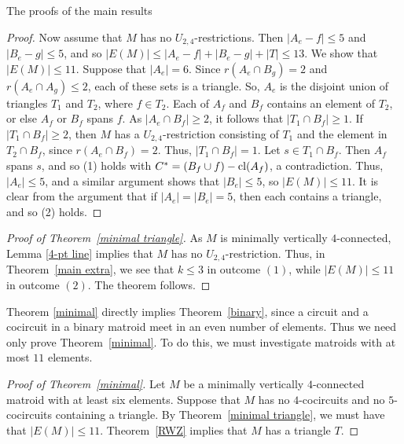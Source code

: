 \documentclass[12pt]{amsart}
\begin{document}
\begin{section}{The proofs of the main results}
\begin{proof}
Now assume that $M$ has no $U_{2,4}$-restrictions.
Then $|A_e - f| \le 5$ and $|B_e - g| \le 5$, and so $|E(M)| \le |A_e - f| + |B_e - g| + |T| \le 13$.
We show that $|E(M)| \le 11$.
Suppose that $|A_e| = 6$.
Since $r(A_e \cap B_g) = 2$ and $r(A_e \cap A_g) \le 2$, each of these sets is a triangle.
So, $A_e$ is the disjoint union of triangles $T_1$ and $T_2$, where $f \in T_2$.
Each of $A_f$ and $B_f$ contains an element of $T_2$, or else $A_f$ or $B_f$ spans $f$.
As $|A_e \cap B_f| \ge 2$, it follows that $|T_1 \cap B_f| \ge 1$.
If $|T_1 \cap B_f| \ge 2$, then $M$ has a $U_{2,4}$-restriction consisting of $T_1$ and the element in $T_2 \cap B_f$, since $r(A_e \cap B_f) = 2$.
Thus, $|T_1 \cap B_f| = 1$.
Let $s \in T_1 \cap B_f$.
Then $A_f$ spans $s$, and so (1) holds with $C^* = (B_f \cup f) - \operatorname{cl}(A_f)$, a contradiction.
Thus, $|A_e| \le 5$, and a similar argument shows that $|B_e| \le 5$, so $|E(M)| \le 11$.
It is clear from the argument that if $|A_e| = |B_e| = 5$, then each contains a triangle, and so (2) holds.
\end{proof}




\begin{proof}[Proof of Theorem~\ref{minimal triangle}]
As $M$ is minimally vertically $4$-connected, Lemma \ref{4-pt line} implies that $M$ has no $U_{2,4}$-restriction.
Thus, in Theorem~\ref{main extra}, we see that $k \le 3$ in outcome $(1)$, while $|E(M)| \le 11$ in outcome $(2)$.
The theorem follows.
\end{proof}


Theorem \ref{minimal} directly implies Theorem~\ref{binary}, since a circuit and a cocircuit in a binary matroid meet in an even number of elements.
Thus we need only prove Theorem~\ref{minimal}.
To do this, we must investigate matroids with at most $11$ elements.


\begin{proof}[Proof of Theorem~\ref{minimal}]
Let $M$ be a minimally vertically $4$-connected matroid with at least six elements.
Suppose that $M$ has no $4$-cocircuits and no $5$-cocircuits containing a triangle.
By Theorem~\ref{minimal triangle}, we must have that $|E(M)| \le 11$.
Theorem~\ref{RWZ} implies that $M$ has a triangle $T$.



\end{proof}
\end{section}
\end{document}
